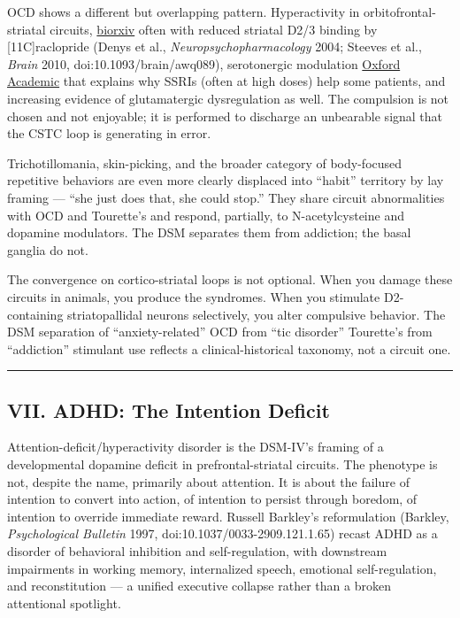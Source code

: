 OCD shows a different but overlapping pattern. Hyperactivity in orbitofrontal-striatal circuits, \href{https://www.biorxiv.org/content/10.1101/2021.02.11.430770.full.pdf}{biorxiv} often with reduced striatal D2/3 binding by {[}11C{]}raclopride (Denys et al., \emph{Neuropsychopharmacology} 2004; Steeves et al., \emph{Brain} 2010, doi:10.1093/brain/awq089), serotonergic modulation \href{https://academic.oup.com/book/24387/chapter/187317098}{Oxford Academic} that explains why SSRIs (often at high doses) help some patients, and increasing evidence of glutamatergic dysregulation as well. The compulsion is not chosen and not enjoyable; it is performed to discharge an unbearable signal that the CSTC loop is generating in error.

Trichotillomania, skin-picking, and the broader category of body-focused repetitive behaviors are even more clearly displaced into ``habit'' territory by lay framing --- ``she just does that, she could stop.'' They share circuit abnormalities with OCD and Tourette's and respond, partially, to N-acetylcysteine and dopamine modulators. The DSM separates them from addiction; the basal ganglia do not.

The convergence on cortico-striatal loops is not optional. When you damage these circuits in animals, you produce the syndromes. When you stimulate D2-containing striatopallidal neurons selectively, you alter compulsive behavior. The DSM separation of ``anxiety-related'' OCD from ``tic disorder'' Tourette's from ``addiction'' stimulant use reflects a clinical-historical taxonomy, not a circuit one.

\begin{center}\rule{0.5\linewidth}{0.5pt}\end{center}

\subsection{VII. ADHD: The Intention Deficit}\label{09_dopamine_spectrum-vii.-adhd-the-intention-deficit}

Attention-deficit/hyperactivity disorder is the DSM-IV's framing of a developmental dopamine deficit in prefrontal-striatal circuits. The phenotype is not, despite the name, primarily about attention. It is about the failure of intention to convert into action, of intention to persist through boredom, of intention to override immediate reward. Russell Barkley's reformulation (Barkley, \emph{Psychological Bulletin} 1997, doi:10.1037/0033-2909.121.1.65) recast ADHD as a disorder of behavioral inhibition and self-regulation, with downstream impairments in working memory, internalized speech, emotional self-regulation, and reconstitution --- a unified executive collapse rather than a broken attentional spotlight.

